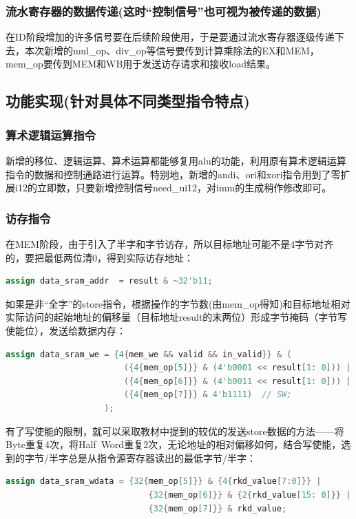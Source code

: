 \documentclass[11pt]{article}
\begin{document}
\subsubsection{流水寄存器的数据传递(这时“控制信号”也可视为被传递的数据)}
在ID阶段增加的许多信号要在后续阶段使用，于是要通过流水寄存器逐级传递下去，本次新增的mul_op、div_op等信号要传到计算乘除法的EX和MEM，mem_op要传到MEM和WB用于发送访存请求和接收load结果。


\subsection{功能实现(针对具体不同类型指令特点)}

\subsubsection{算术逻辑运算指令}
新增的移位、逻辑运算、算术运算都能够复用alu的功能，利用原有算术逻辑运算指令的数据和控制通路进行运算。特别地，新增的andi、ori和xori指令用到了零扩展i12的立即数，只要新增控制信号need_ui12，对imm的生成稍作修改即可。

\subsubsection{访存指令}

在MEM阶段，由于引入了半字和字节访存，所以目标地址可能不是4字节对齐的，要把最低两位清0，得到实际访存地址：
\begin{lstlisting}[language=Verilog, caption={访存地址}]
assign data_sram_addr  = result & ~32'b11;
\end{lstlisting}

如果是非“全字”的store指令，根据操作的字节数(由mem_op得知)和目标地址相对实际访问的起始地址的偏移量（目标地址result的末两位）形成字节掩码（字节写使能位），发送给数据内存：
\begin{lstlisting}[language=Verilog, caption={store字节写使能}]
assign data_sram_we = {4{mem_we && valid && in_valid}} & (
                        ({4{mem_op[5]}} & (4'b0001 << result[1: 0])) |  // SB
                        ({4{mem_op[6]}} & (4'b0011 << result[1: 0])) |  // SH
                        ({4{mem_op[7]}} & 4'b1111)  // SW;
                    );
\end{lstlisting}
有了写使能的限制，就可以采取教材中提到的较优的发送store数据的方法——将Byte重复4次，将Half\ Word重复2次，无论地址的相对偏移如何，结合写使能，选到的字节/半字总是从指令源寄存器读出的最低字节/半字：

\begin{lstlisting}[language=Verilog, caption={store数据}]
assign data_sram_wdata = {32{mem_op[5]}} & {4{rkd_value[7:0]}} | 
                             {32{mem_op[6]}} & {2{rkd_value[15: 0]}} |
                             {32{mem_op[7]}} & rkd_value;
\end{lstlisting}
\end{document}
